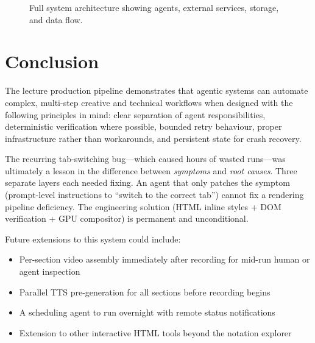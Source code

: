 \documentclass[12pt,a4paper]{article}
\begin{document}
\begin{figure}[h]
\caption{Full system architecture showing agents, external services, storage,
         and data flow.}
\label{fig:arch}
\end{figure}

\section{Conclusion}

The lecture production pipeline demonstrates that agentic systems can automate
complex, multi-step creative and technical workflows when designed with the
following principles in mind: clear separation of agent responsibilities,
deterministic verification where possible, bounded retry behaviour, proper
infrastructure rather than workarounds, and persistent state for crash recovery.

The recurring tab-switching bug---which caused hours of wasted runs---was
ultimately a lesson in the difference between \emph{symptoms} and
\emph{root causes}. Three separate layers each needed fixing. An agent that
only patches the symptom (prompt-level instructions to ``switch to the correct
tab'') cannot fix a rendering pipeline deficiency. The engineering solution
(HTML inline styles + DOM verification + GPU compositor) is permanent and
unconditional.

Future extensions to this system could include:
\begin{itemize}[leftmargin=2em]
  \item Per-section video assembly immediately after recording for mid-run
        human or agent inspection
  \item Parallel TTS pre-generation for all sections before recording begins
  \item A scheduling agent to run overnight with remote status notifications
  \item Extension to other interactive HTML tools beyond the notation explorer
\end{itemize}
\end{document}
